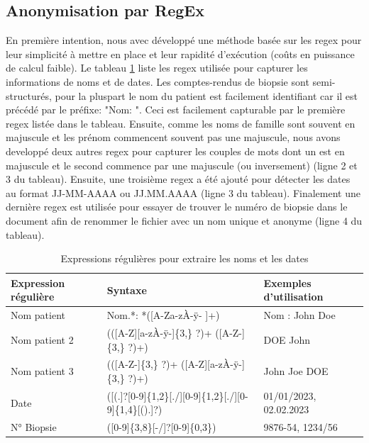 \subsection{Anonymisation par RegEx}
En première intention, nous avec développé une méthode basée sur les \gls{regex} pour leur simplicité à mettre en place et leur rapidité d'exécution (coûts en puissance de calcul faible). Le tableau \ref{tab:regex} liste les \gls{regex} utilisée pour capturer les informations de noms et de dates. Les comptes-rendus de biopsie sont semi-structurés, pour la pluspart le nom du patient est facilement identifiant car il est précédé par le préfixe: "Nom: ". Ceci est facilement capturable par le première \gls{regex} listée dans le tableau. Ensuite, comme les noms de famille sont souvent en majuscule et les prénom commencent souvent pas une majuscule, nous avons developpé deux autres \gls{regex} pour capturer les couples de mots dont un est en majuscule et le second commence par une majuscule (ou inversement) (ligne 2 et 3 du tableau). 
Ensuite, une troisième \gls{regex} a été ajouté pour détecter les dates au format JJ-MM-AAAA ou JJ.MM.AAAA (ligne 3 du tableau). Finalement une dernière \gls{regex} est utilisée pour essayer de trouver le numéro de biopsie dans le document afin de renommer le fichier avec un nom unique et anonyme (ligne 4 du tableau). 
\begin{table}[ht]
\centering
\caption{Expressions régulières pour extraire les noms et les dates}
\label{tab:regex}
\begin{tabular}{|l|l|l|}
\hline
\textbf{Expression régulière} & \textbf{Syntaxe} & \textbf{Exemples d'utilisation} \\ \hline
Nom patient & Nom.*: *([A-Za-zÀ-ÿ- ]+) & Nom : John Doe \\ \hline
Nom patient 2& (([A-Z][a-zÀ-ÿ-]\{3,\} ?)+ ([A-Z-]\{3,\} ?)+) & DOE John \\ \hline
Nom patient 3 & (([A-Z-]\{3,\} ?)+ ([A-Z][a-zÀ-ÿ-]\{3,\} ?)+) & John Joe DOE \\ \hline
Date & ([(.]?[0-9]\{1,2\}[./][0-9]\{1,2\}[./][0-9]\{1,4\}[().]?) & 01/01/2023, 02.02.2023 \\ \hline
N° Biopsie & ([0-9]\{3,8\}[-/]?[0-9]\{0,3\}) & 9876-54, 1234/56 \\ \hline
\end{tabular}
\end{table}
